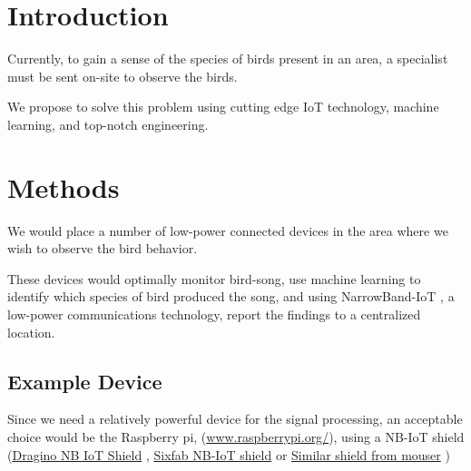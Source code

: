 

\section{Introduction}

    Currently, to gain a sense of the species of birds
    present in an area, a specialist must be sent on-site
    to observe the birds.
    
    We propose to solve this problem using cutting edge IoT
    technology, machine learning, 
    and top-notch engineering. 

\section{Methods}
    We would place a number of low-power connected devices 
    in the area where we wish to observe the bird behavior.

    These devices would optimally monitor bird-song, use
    machine learning to identify which species of bird produced
    the song\cite{614790}, and using NarrowBand-IoT
    \cite{ratasuk2016overview}, a low-power communications 
    technology, report the findings to a centralized location.
     
    \subsection{Example Device}

    Since we need a relatively powerful device for the signal
    processing, an 
    acceptable choice would be the Raspberry pi, 
    (\href{https://www.raspberrypi.org/}{www.raspberrypi.org/}),
    using a NB-IoT shield 
    (\href{https://www.seeedstudio.com/Dragino-NB-IoT-Shield-B5-p-3082.html}{Dragino NB IoT Shield}
    ,
    \href{https://sixfab.com/product/raspberry-pi-nb-iot-shield/}{Sixfab NB-IoT shield}
    or
    \href{https://eu.mouser.com/ProductDetail/DFRobot/DFR0505?qs=sGAEpiMZZMve4%2FbfQkoj%252BBXWRlp4a5ROxBo2Cyn%252BqlY%3D}{Similar shield from mouser}
    )

